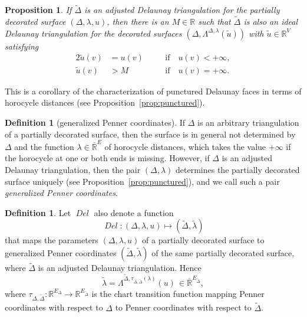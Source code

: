 \documentclass[a4paper, 11pt]{article}
\newcommand{\R}{\mathbb{R}}
\newcommand{\Rbar}{\overline{\R}}
\newcommand{\Deltil}{\widetilde{\Delta}}
\newcommand{\lamtil}{\tilde{\lambda}}
\newcommand{\Del}{\operatorname{\textit{Del}}}
\theoremstyle{plain}
\newtheorem{proposition}[theorem]{Proposition}
\theoremstyle{definition}
\newtheorem{definition}[theorem]{Definition}
\begin{document}
\begin{proposition}
  \label{prop:Dellim}
  If $\Deltil$ is an adjusted Delaunay triangulation for the partially
  decorated surface $(\Delta,\lambda,u)$, then there is an $M\in\R$
  such that $\Deltil$ is also an ideal Delaunay triangulation for the
  decorated surfaces $(\Delta,\Lambda^{\Delta,\lambda}(\tilde{u}))$
  with $\tilde{u}\in\R^{V}$ satisfying
  \begin{alignat*}{2}
    \tilde{u}(v)&=u(v)\quad&
    &\text{if}\quad u(v)<+\infty,\\
    \tilde{u}(v)&>M\quad&
    &\text{if}\quad u(v)=+\infty.
  \end{alignat*}
\end{proposition}

This is a corollary of the characterization of punctured Delaunay
faces in terms of horocycle distances
(see Proposition~\ref{prop:punctured}).

\begin{definition}[generalized Penner coordinates]
  \label{def:genpenner}
  If $\Delta$ is an arbitrary triangulation of a partially decorated
  surface, then the surface is in general not determined by $\Delta$
  and the function $\lambda\in\Rbar^{E}$ of horocycle distances, which
  takes the value $+\infty$ if the horocycle at one or both ends is
  missing. However, if $\Delta$ is an adjusted Delaunay triangulation,
  then the pair $(\Delta,\lambda)$ determines the partially decorated surface
  uniquely (see Proposition~\ref{prop:punctured}), and we call such a
  pair \emph{generalized Penner coordinates}.
\end{definition}

\begin{definition}
  \label{def:Del2}
  Let $\Del$ also denote a function
  \begin{equation*}
    \Del:(\Delta,\lambda,u)\longmapsto (\Deltil,\lamtil)
  \end{equation*}
  that maps the parameters $(\Delta,\lambda,u)$ of a partially
  decorated surface to generalized Penner coordinates
  $(\Deltil,\lamtil)$ of the same partially decorated surface, where
  $\Deltil$ is an adjusted Delaunay triangulation. Hence
  \begin{equation*}
    \lamtil=\Lambda^{\Deltil,\tau_{\Delta,\Deltil}(\lambda)}(u)\,
    \in\Rbar^{E_{\Deltil}},
  \end{equation*}
  where
  $\tau_{\Delta,\Deltil}:\R^{E_{\Delta}}\rightarrow\R^{E_{\Deltil}}$
  is the chart transition function mapping Penner coordinates with
  respect to $\Delta$ to Penner coordinates with respect to $\Deltil$.
\end{definition}
\end{document}
